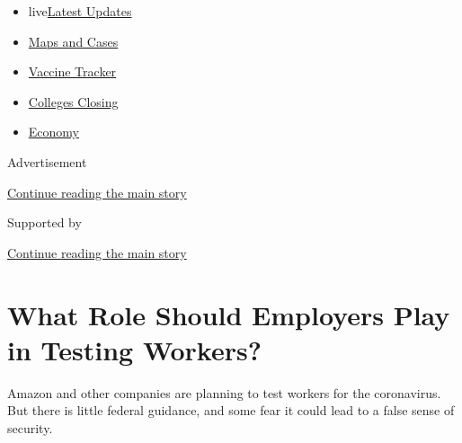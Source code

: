 \begin{itemize}
\tightlist
\item
  live\href{https://www.nytimes3xbfgragh.onion/2020/08/21/world/covid-19-coronavirus.html?name=styln-coronavirus-markets\&region=TOP_BANNER\&variant=undefined\&block=storyline_menu_recirc\&action=click\&pgtype=Article\&impression_id=ebda9af1-e3a6-11ea-945d-0babcf13dc84}{Latest
  Updates}
\item
  \href{https://www.nytimes3xbfgragh.onion/interactive/2020/us/coronavirus-us-cases.html?name=styln-coronavirus-markets\&region=TOP_BANNER\&variant=undefined\&block=storyline_menu_recirc\&action=click\&pgtype=Article\&impression_id=ebda9af2-e3a6-11ea-945d-0babcf13dc84}{Maps
  and Cases}
\item
  \href{https://www.nytimes3xbfgragh.onion/interactive/2020/science/coronavirus-vaccine-tracker.html?name=styln-coronavirus-markets\&region=TOP_BANNER\&variant=undefined\&block=storyline_menu_recirc\&action=click\&pgtype=Article\&impression_id=ebdac200-e3a6-11ea-945d-0babcf13dc84}{Vaccine
  Tracker}
\item
  \href{https://www.nytimes3xbfgragh.onion/2020/08/19/us/colleges-closing-covid.html?name=styln-coronavirus-markets\&region=TOP_BANNER\&variant=undefined\&block=storyline_menu_recirc\&action=click\&pgtype=Article\&impression_id=ebdac201-e3a6-11ea-945d-0babcf13dc84}{Colleges
  Closing}
\item
  \href{https://www.nytimes3xbfgragh.onion/live/2020/08/20/business/stock-market-today-coronavirus?name=styln-coronavirus-markets\&region=TOP_BANNER\&variant=undefined\&block=storyline_menu_recirc\&action=click\&pgtype=Article\&impression_id=ebdac202-e3a6-11ea-945d-0babcf13dc84}{Economy}
\end{itemize}

Advertisement

\protect\hyperlink{after-top}{Continue reading the main story}

Supported by

\protect\hyperlink{after-sponsor}{Continue reading the main story}

\hypertarget{what-role-should-employers-play-in-testing-workers}{%
\section{What Role Should Employers Play in Testing
Workers?}\label{what-role-should-employers-play-in-testing-workers}}

Amazon and other companies are planning to test workers for the
coronavirus. But there is little federal guidance, and some fear it
could lead to a false sense of security.

